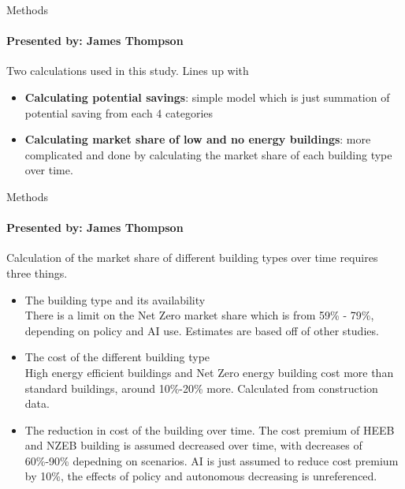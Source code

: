\documentclass{beamer}
\begin{document}
\begin{frame}{Methods}
\framesubtitle{Presented by: James Thompson}

Two calculations used in this study. Lines up with 
\pause
\begin{itemize}[<+->]
    \item \textbf{Calculating potential savings}: simple model which is just summation of potential saving from each 4 categories
    \item \textbf{Calculating market share of low and no energy buildings}: more complicated and done by calculating the market share of each building type over time.
\end{itemize}
\end{frame}

\begin{frame}{Methods}
\framesubtitle{Presented by: James Thompson}

Calculation of the market share of different building types over time requires three things.
\begin{itemize}[<+->]
    \item The building type and its availability\\
    There is a limit on the Net Zero market share which is from 59\% - 79\%, depending on policy and AI use. Estimates are based off of other studies.
    \item The cost of the different building type\\
    High energy efficient buildings and Net Zero energy building cost more than standard buildings, around 10\%-20\% more. Calculated from construction data.
    \item The reduction in cost of the building over time.
    The cost premium of HEEB and NZEB building is assumed decreased over time, with decreases of 60\%-90\% depedning on scenarios. AI is just assumed to reduce cost premium by 10\%, the effects of policy and autonomous decreasing is unreferenced.
\end{itemize}
    
\end{frame}
\end{document}
